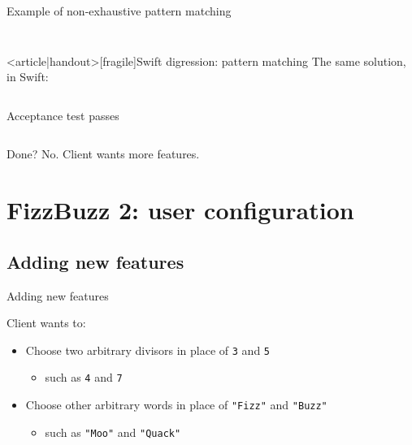 \begin{frame}[fragile]{Example of non-exhaustive pattern matching}
  \inputminted{rust}{FizzBuzz2Bad.rs}

  \inputminted{console}{testQuick4.console}
\end{frame}

\begin{frame}<article|handout>[fragile]{Swift digression: pattern matching}
  The same solution, in Swift:

  \inputminted{swift}{FizzBuzz2.swift}
\end{frame}

\begin{frame}[fragile]{Acceptance test passes}

  \inputminted{console}{testQuick5.console}

  \begin{block}{Done?}
    No. Client wants more features.
  \end{block}
\end{frame}

\section{FizzBuzz 2: user configuration}

\subsection{Adding new features}

\begin{frame}{Adding new features}
  \begin{block}{Client wants to:}
    \begin{itemize}
    \item Choose two \alert{arbitrary} divisors in place of \texttt{3} and \texttt{5}
      \begin{itemize}
      \item such as \texttt{4} and \texttt{7}
      \end{itemize}
    \item Choose other \alert{arbitrary} words in place of \texttt{"Fizz"} and \texttt{"Buzz"}
      \begin{itemize}
      \item such as \texttt{"Moo"} and \texttt{"Quack"}

      \end{itemize}
    \end{itemize}
  \end{block}
\end{frame}

